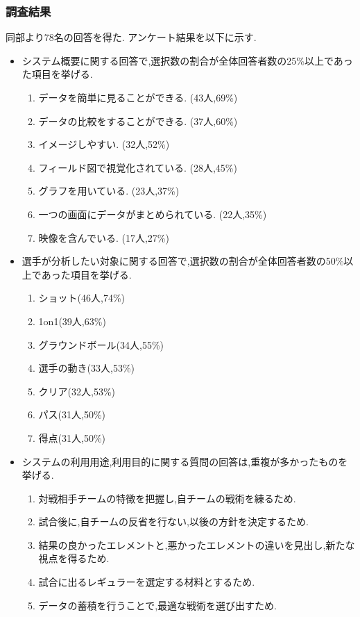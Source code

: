 \documentclass[sotsuron]{kuee}
\begin{document}
			\subsubsection{調査結果}
				同部より78名の回答を得た. アンケート結果を以下に示す. 
				\begin{itemize}
				\item システム概要に関する回答で,選択数の割合が全体回答者数の25\%以上であった項目を挙げる. 
					\begin{enumerate}
					\item データを簡単に見ることができる. (43人,69\%)
					\item データの比較をすることができる. (37人,60\%)
					\item イメージしやすい. (32人,52\%)
					\item フィールド図で視覚化されている. (28人,45\%)
					\item グラフを用いている. (23人,37\%)
					\item 一つの画面にデータがまとめられている. (22人,35\%)
					\item 映像を含んでいる. (17人,27\%)
					\end{enumerate}
				\item 選手が分析したい対象に関する回答で,選択数の割合が全体回答者数の50\%以上であった項目を挙げる. 
					\begin{enumerate}
					\item ショット(46人,74\%)
					\item 1on1(39人,63\%)
					\item グラウンドボール(34人,55\%)
					\item 選手の動き(33人,53\%)
					\item クリア(32人,53\%)
					\item パス(31人,50\%)
					\item 得点(31人,50\%)
					\end{enumerate}
				\item システムの利用用途,利用目的に関する質問の回答は,重複が多かったものを挙げる. 
					\begin{enumerate}
					\item 対戦相手チームの特徴を把握し,自チームの戦術を練るため. 
					\item 試合後に,自チームの反省を行ない,以後の方針を決定するため. 
					\item 結果の良かったエレメントと,悪かったエレメントの違いを見出し,新たな視点を得るため. 
					\item 試合に出るレギュラーを選定する材料とするため. 
					\item データの蓄積を行うことで,最適な戦術を選び出すため. 
					\end{enumerate}
				\end{itemize}
\end{document}
